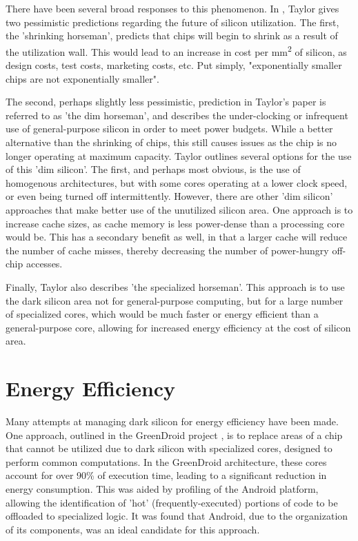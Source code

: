 \documentclass{UoYCSproject}
\begin{document}
There have been several broad responses to this phenomenon.
In \cite{four-horsemen}, Taylor gives two pessimistic predictions regarding the future of silicon
utilization. The first, the 'shrinking horseman', predicts that chips will begin to shrink as a result of
the utilization wall. This would lead to an increase in cost per mm\textsuperscript{2} of silicon, as
design costs, test costs, marketing costs, etc. Put simply, "exponentially smaller chips are not
exponentially smaller".

The second, perhaps slightly less pessimistic, prediction in Taylor's paper
is referred to as 'the dim horseman', and describes the under-clocking or infrequent use of
general-purpose silicon in order to meet power budgets. While a better alternative than the shrinking
of chips, this still causes issues as the chip is no longer operating at maximum capacity.
Taylor outlines several options for the use of this 'dim silicon'. The first, and perhaps most obvious,
is the use of homogenous architectures, but with some cores operating at a lower clock speed, or
even being turned off intermittently. However, there are other 'dim silicon' approaches that make better
use of the unutilized silicon area. One approach is to increase cache sizes, as cache memory is less
power-dense than a processing core would be. This has a secondary benefit as well, in that a larger
cache will reduce the number of cache misses, thereby decreasing the number of power-hungry off-chip
accesses.

Finally, Taylor also describes 'the specialized horseman'. This approach is to use the dark silicon area
not for general-purpose computing, but for a large number of specialized cores, which would be much
faster or energy efficient than a general-purpose core, allowing for increased energy efficiency at the
cost of silicon area.

\section{Energy Efficiency}

Many attempts at managing dark silicon for energy efficiency have been made. One approach, outlined in the
GreenDroid project \cite{greendroid}, is to replace areas of a chip that cannot be utilized due to dark
silicon with specialized cores, designed to perform common computations. In the GreenDroid architecture,
these cores account for over 90\% of execution time, leading to a significant reduction in energy
consumption. This was aided by profiling of the Android platform, allowing the identification of 'hot'
(frequently-executed) portions of code to be offloaded to specialized logic. It was found that Android,
due to the organization of its components, was an ideal candidate for this approach.
\end{document}
